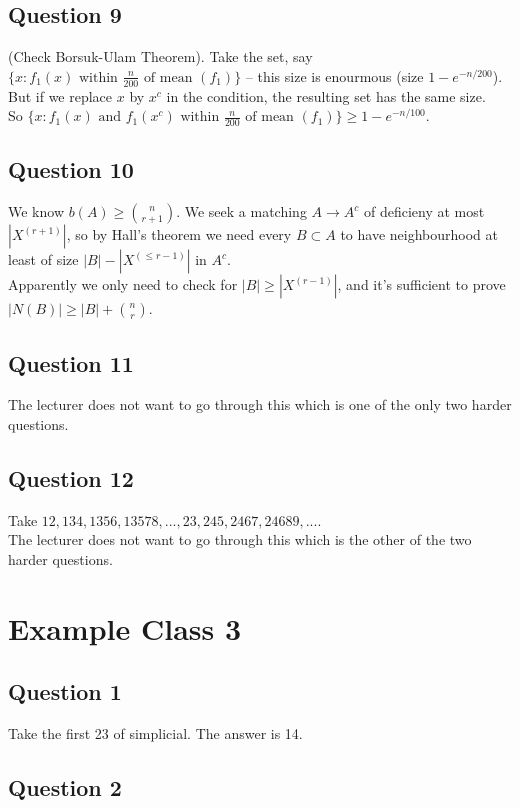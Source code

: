 \documentclass[a4paper]{article}
\begin{document}
\subsection{Question 9}
(Check Borsuk-Ulam Theorem). Take the set, say $\{x:f_1(x) \text{ within } \frac{n}{200} \text{ of mean } (f_1)\}$ -- this size is enourmous (size $1-e^{-n/200}$). But if we replace $x$ by $x^c$ in the condition, the resulting set has the same size.\\
So $\{x:f_1(x) \text{ and } f_1(x^c) \text{ within } \frac{n}{200} \text{ of mean } (f_1)\} \geq 1-e^{-n/100}$.

\subsection{Question 10}
We know $b(A) \geq {n \choose {r+1}}$. We seek a matching $A \to A^c$ of deficieny at most $|X^{(r+1)}|$, so by Hall's theorem we need every $B\subset A$ to have neighbourhood at least of size $|B| - |X^{(\leq r-1)}|$ in $A^c$.\\
Apparently we only need to check for $|B| \geq |X^{(r-1)}|$, and it's sufficient to prove $|N(B)| \geq |B| + {n \choose r}$.

\subsection{Question 11}
The lecturer does not want to go through this which is one of the only two harder questions.

\subsection{Question 12}
Take $12,134,1356,13578,...,23,245,2467,24689,...$.\\
The lecturer does not want to go through this which is the other of the two harder questions.

\newpage

\section{Example Class 3}

\subsection{Question 1}

Take the first 23 of simplicial. The answer is 14.

\subsection{Question 2}
\end{document}
